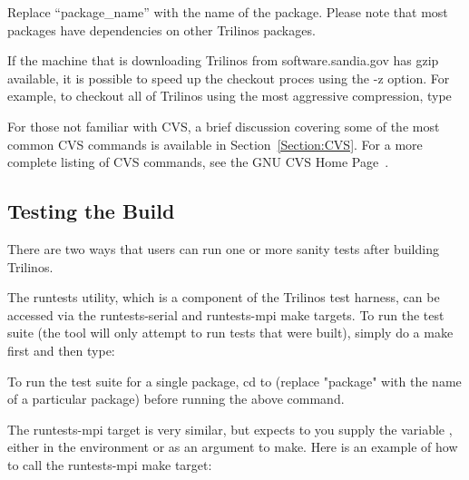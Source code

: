 \documentclass[12pt,relax]{TrilinosUserGuide}
\begin{document}

Replace ``package\_name'' with the name of the package.  Please note
that most packages have dependencies on other Trilinos packages.

If the machine that is downloading Trilinos from software.sandia.gov has gzip
available, it is possible to speed up the checkout proces using the -z
option.  For example, to checkout all of Trilinos using the most aggressive
compression, type


For those not familiar with CVS, a brief discussion covering some of the most
common CVS commands is available in Section~\ref{Section:CVS}.  For a more
complete listing of CVS commands, see the GNU CVS Home Page~\cite{CVS}.




\subsection{Testing the Build}
\label{subsect:TestHarness}

There are two ways that users can run one or more sanity tests after building
Trilinos.


The runtests utility, which is a component of the Trilinos test
harness, can be accessed via the runtests-serial and runtests-mpi make
targets.
To run the test suite (the tool will only attempt to run tests that were
built), simply do a make first and then type:


To run the test suite for a single package, cd to
 (replace "package" with the name of a
particular package) before running the above command.

The runtests-mpi target is very similar, but expects to you supply the
variable , either in the environment or as an
argument to make.  Here is an example of how to call the runtests-mpi make
target:
\end{document}
